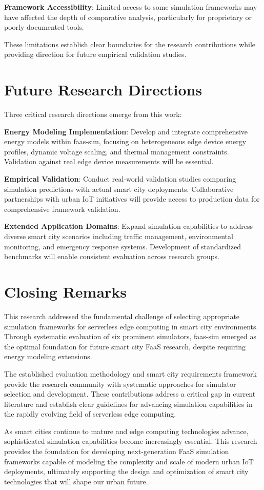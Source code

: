 \textbf{Framework Accessibility}: Limited access to some simulation frameworks may have affected the depth of comparative analysis, particularly for proprietary or poorly documented tools.

These limitations establish clear boundaries for the research contributions while providing direction for future empirical validation studies.

\section{Future Research Directions}



Three critical research directions emerge from this work:

\textbf{Energy Modeling Implementation}: Develop and integrate comprehensive energy models within faas-sim, focusing on heterogeneous edge device energy profiles, dynamic voltage scaling, and thermal management constraints. Validation against real edge device measurements will be essential.

\textbf{Empirical Validation}: Conduct real-world validation studies comparing simulation predictions with actual smart city deployments. Collaborative partnerships with urban IoT initiatives will provide access to production data for comprehensive framework validation.

\textbf{Extended Application Domains}: Expand simulation capabilities to address diverse smart city scenarios including traffic management, environmental monitoring, and emergency response systems. Development of standardized benchmarks will enable consistent evaluation across research groups.

\section{Closing Remarks}

This research addressed the fundamental challenge of selecting appropriate simulation frameworks for serverless edge computing in smart city environments. Through systematic evaluation of six prominent simulators, faas-sim emerged as the optimal foundation for future smart city FaaS research, despite requiring energy modeling extensions.

The established evaluation methodology and smart city requirements framework provide the research community with systematic approaches for simulator selection and development. These contributions address a critical gap in current literature and establish clear guidelines for advancing simulation capabilities in the rapidly evolving field of serverless edge computing.

As smart cities continue to mature and edge computing technologies advance, sophisticated simulation capabilities become increasingly essential. This research provides the foundation for developing next-generation FaaS simulation frameworks capable of modeling the complexity and scale of modern urban IoT deployments, ultimately supporting the design and optimization of smart city technologies that will shape our urban future.